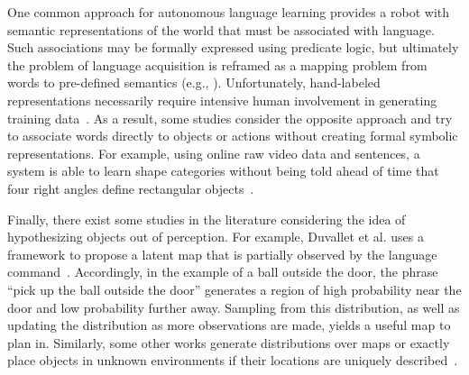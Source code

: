 One common approach for autonomous language learning provides a robot with semantic representations of the world that must be associated with language.
Such associations may be formally expressed using predicate logic, but ultimately the problem of language acquisition is reframed as a mapping problem from words to pre-defined semantics (e.g., \cite{langlearn1,langlearn2,formal1,formal2}).
Unfortunately, hand-labeled representations necessarily require intensive human involvement in generating training data~\cite{mooneypivot}.
As a result, some studies consider the opposite approach and try to associate words directly to objects or actions without creating formal symbolic representations.
For example, using online raw video data and sentences, a system is able to learn shape categories without being told ahead of time that four right angles define rectangular objects~\cite{langlearn3,langlearn4}.

Finally, there exist some studies in the literature considering the idea of hypothesizing objects out of perception. For example, Duvallet et al. uses a framework to propose a latent map that is partially observed by the language command~\cite{citeLangNoisySensor}.
Accordingly, in the example of a ball outside the door, the phrase ``pick up the ball outside the door'' generates a region of high probability near the door and low probability further away.
Sampling from this distribution, as well as updating the distribution as more observations are made, yields a useful map to plan in.
Similarly, some other works generate distributions over maps or exactly place objects in unknown environments if their locations are uniquely described~\cite{learningSemanticMaps,outside1}.